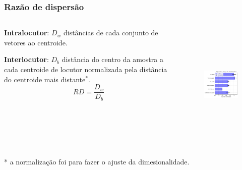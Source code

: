 \documentclass[121pt, aspectratio=169, t]{beamer}
\begin{document}
\begin{frame}[fragile=singleslide]
	\frametitle{Razão de dispersão}
	
	\begin{columns}
		\begin{column}{0.45\textwidth}			
			\textbf{Intralocutor}: $D_w$ distâncias de cada conjunto de vetores ao centroide.\\
			\vspace{0.5cm}
			
			\textbf{Interlocutor}: $D_b$ distância do centro da amostra a cada centroide de locutor normalizada pela distância do centroide mais distante$^*$.\\
			
			\[RD = \frac{D_w}{D_b} \]
		\end{column}
		\begin{column}{0.54\textwidth}  %
				\vspace{-1.0cm}
				\begin{figure}
				\centering
				\includegraphics[height=5.9cm]{Dispersao.png}
			\end{figure}			
		\end{column}
		
	\end{columns}
	\vfill
	* a normalização foi para fazer o ajuste da dimesionalidade.
	
\end{frame}



\end{document}

